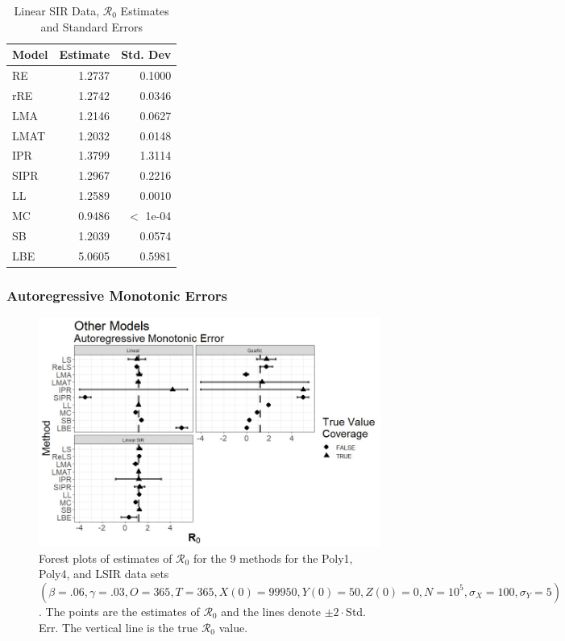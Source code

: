 \documentclass[12pt]{article}
\newcommand{\xxsir}{\ensuremath{9} } %
\newcommand{\rr}{\ensuremath{\mathcal{R}_0}}
\begin{document}
\begin{table}[H]
	
	\centering
	\begin{tabular}[t]{l|r|r}
		\hline
		Model & Estimate & Std. Dev\\
		\hline
		RE & 1.2737 & 0.1000\\
		\hline
		rRE & 1.2742 & 0.0346\\
		\hline
		LMA & 1.2146 & 0.0627\\
		\hline
		LMAT & 1.2032 & 0.0148\\
		\hline
		IPR & 1.3799 & 1.3114\\
		\hline
		SIPR & 1.2967 & 0.2216\\
		\hline
		LL & 1.2589 & 0.0010\\
		\hline
		MC & 0.9486 & $<$ 1e-04\\
		\hline
		SB & 1.2039 & 0.0574\\
		\hline
		LBE & 5.0605 & 0.5981\\
		\hline
	\end{tabular}
	\caption{Linear SIR Data, $\rr$ Estimates and Standard Errors}
\end{table}

\subsubsection{Autoregressive Monotonic Errors}

\begin{figure}[H]
	\begin{center}
		\includegraphics[scale=0.5]{images/other_arm.jpg}
		\caption{Forest plots of estimates of $\rr$ for the \xxsir methods for the Poly1, Poly4, and LSIR data sets $(\beta=.06, \gamma=.03, O=365, T=365, X(0)=99950, Y(0)=50, Z(0)=0, N=10^5, \sigma_X=100, \sigma_Y=5)$.  The points are the estimates of $\rr$ and the lines denote $\pm 2\cdot $Std. Err.  The vertical line is the true $\rr$ value.}
	\end{center}
\end{figure}
\end{document}
